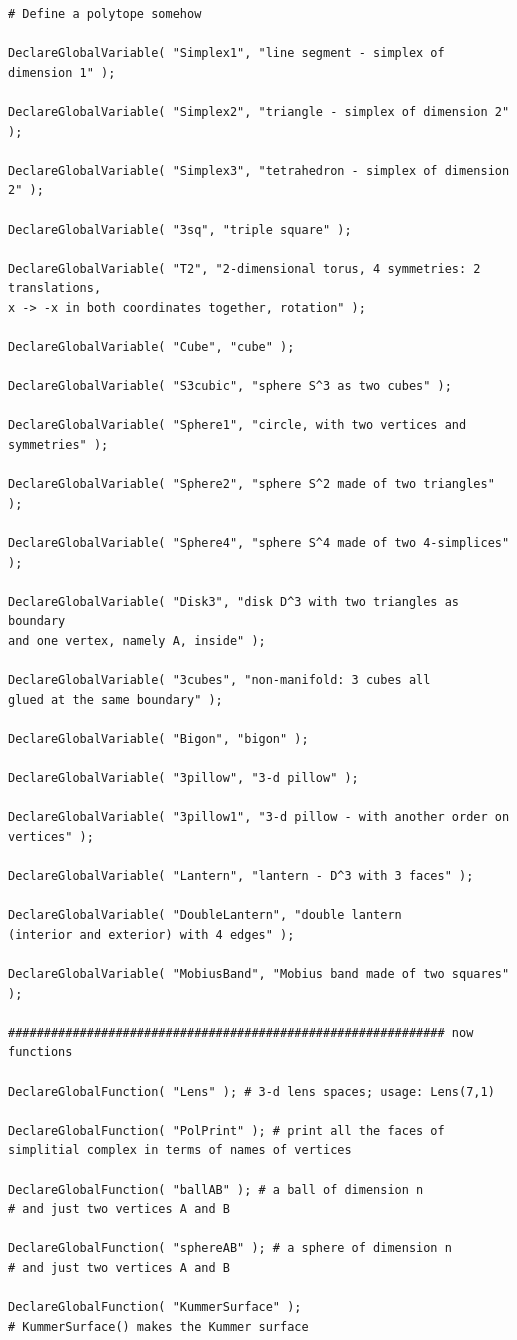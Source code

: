 \documentclass{article}
\begin{document}
\begin{verbatim}
# Define a polytope somehow

DeclareGlobalVariable( "Simplex1", "line segment - simplex of dimension 1" );

DeclareGlobalVariable( "Simplex2", "triangle - simplex of dimension 2" );

DeclareGlobalVariable( "Simplex3", "tetrahedron - simplex of dimension 2" );

DeclareGlobalVariable( "3sq", "triple square" );

DeclareGlobalVariable( "T2", "2-dimensional torus, 4 symmetries: 2 translations, 
x -> -x in both coordinates together, rotation" );

DeclareGlobalVariable( "Cube", "cube" );

DeclareGlobalVariable( "S3cubic", "sphere S^3 as two cubes" );

DeclareGlobalVariable( "Sphere1", "circle, with two vertices and symmetries" );

DeclareGlobalVariable( "Sphere2", "sphere S^2 made of two triangles" );

DeclareGlobalVariable( "Sphere4", "sphere S^4 made of two 4-simplices" );

DeclareGlobalVariable( "Disk3", "disk D^3 with two triangles as boundary 
and one vertex, namely A, inside" );

DeclareGlobalVariable( "3cubes", "non-manifold: 3 cubes all 
glued at the same boundary" );

DeclareGlobalVariable( "Bigon", "bigon" );

DeclareGlobalVariable( "3pillow", "3-d pillow" );

DeclareGlobalVariable( "3pillow1", "3-d pillow - with another order on vertices" );

DeclareGlobalVariable( "Lantern", "lantern - D^3 with 3 faces" );

DeclareGlobalVariable( "DoubleLantern", "double lantern 
(interior and exterior) with 4 edges" );

DeclareGlobalVariable( "MobiusBand", "Mobius band made of two squares" );

############################################################# now functions

DeclareGlobalFunction( "Lens" ); # 3-d lens spaces; usage: Lens(7,1)

DeclareGlobalFunction( "PolPrint" ); # print all the faces of 
simplitial complex in terms of names of vertices

DeclareGlobalFunction( "ballAB" ); # a ball of dimension n 
# and just two vertices A and B

DeclareGlobalFunction( "sphereAB" ); # a sphere of dimension n 
# and just two vertices A and B

DeclareGlobalFunction( "KummerSurface" ); 
# KummerSurface() makes the Kummer surface
\end{verbatim}
\end{document}
